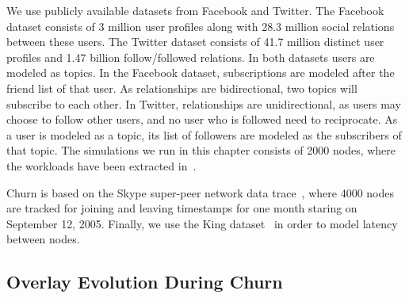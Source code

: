 We use publicly available datasets from
Facebook\cite{facebook-eurosys09} and Twitter\cite{Kwak10www}. The Facebook
dataset consists of 3 million user profiles along with 28.3 million
social relations between these users. The Twitter dataset consists of
41.7 million distinct user profiles and 1.47 billion follow/followed
relations. In both datasets users are modeled as topics. In the Facebook
dataset, subscriptions are modeled after the friend list of that user.
As relationships are bidirectional, two topics will subscribe to each
other. In Twitter, relationships are unidirectional, as users may choose
to follow other users, and no user who is followed need to reciprocate.
As a user is modeled as a topic, its list of followers are modeled as
the subscribers of that topic. The simulations we run in this chapter
consists of 2000 nodes, where the workloads have been extracted in~\cite{Setty:2012}.

Churn is based on the Skype super-peer network data
trace~\cite{Guha:2006}, where 4000 nodes are tracked for joining and
leaving timestamps for one month staring on September 12, 2005. Finally,
we use the King dataset~\cite{king} in order to model latency between
nodes.

\subsection{Overlay Evolution During Churn}
\label{sec:churn}

